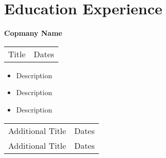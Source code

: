 \section{\sc Education Experience}
{\bf{Copmany Name}}\\
\begin{tabular}{@{}p{5in}p{2in}}
Title & Dates\\
\end{tabular}
\begin{itemize}
\setlength\itemsep{0em}
\item Description
\item Description
\item Description
\end{itemize}
\begin{tabular}{@{}p{5in}p{2in}}
Additional Title & Dates\\
Additional Title & Dates\\
\end{tabular}
\endinput